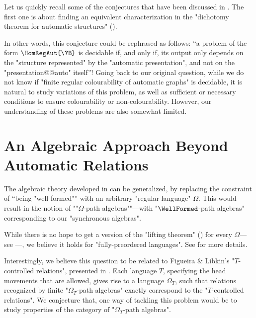 Let us quickly recall some of the conjectures that have been discussed in .
The first one is about finding an equivalent characterization in the "dichotomy theorem
for automatic structures" ().

\conjInvarianceGraphIsomorphisms*

In other words, this conjecture could be rephrased as follows: ``a problem
of the form $\HomRegAut{\?B}$ is decidable if, and only if, its output
only depends on the "structure represented" by the "automatic presentation",
and not on the "presentation@@auto" itself''!
Going back to our original question,
while we do not know if "finite regular colourability of automatic graphs"
is decidable, it is natural to study variations of this problem, as well as
sufficient or necessary conditions to ensure colourability or non-colourability.
However, our understanding of these problems are also somewhat limited.

\conjFiniteColourabilityUndecidable*

\conjUnboundedCliques*

\section{An Algebraic Approach Beyond Automatic Relations}

The algebraic theory developed in  can be generalized,
by replacing the constraint of ``being "well-formed"'' with an arbitrary
"regular language" $\Omega$. This would result in the notion
of \AP""$\Omega$-path algebras""---with "$\WellFormed$-path algebras" corresponding
to our "synchronous algebras".

While there is no hope to get a version of the
"lifting theorem" () for every $\Omega$---see ---, we believe it holds for "fully-preordered languages".
See  for more details.

Interestingly, we believe this question to be related to Figueira \& Libkin's
"$T$-controlled relations", presented in
.
Each language $T$, specifying the head movements that are allowed,
gives rise to a language $\Omega_T$, such that relations recognized
by finite "$\Omega_T$-path algebras" exactly correspond to 
the "$T$-controlled relations".
\opbControlledRelations
We conjecture that, one way of tackling this problem would be to study properties of
the category of "$\Omega_T$-path algebras".

